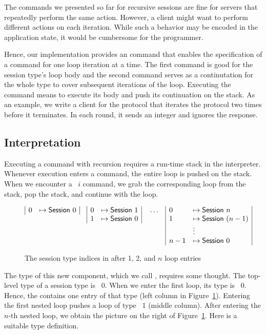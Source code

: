 \documentclass[acmsmall,review,anonymous,screen]{acmart}
\begin{document}
The commands we presented so far for recursive sessions are fine for
servers that repeatedly perform the same action. However, a client
might want to perform different actions on each iteration. While such
a behavior may be encoded in the application state, it would be cumbersome for the programmer.

Hence, our implementation provides an {\AUNROLL} command that
enables the specification of a command for one loop iteration at a time.
\rstCommandUNROLL
The first command is good for the session type's loop body and the
second command serves as a continutation for the whole type to cover subsequent
iterations of the loop. 
Executing the {\AUNROLL} command means to execute its body and push its
continuation on the stack.
\rstExecutorUNROLL
As an example, we write a client for the {\Amanyunaryp} protocol that
iterates the protocol two times before it terminates. In each round,
it sends an integer and ignores the response.
\rstClientExample

\subsection{Interpretation}
\label{sec:interpretaion}


Executing a command with recursion requires a run-time stack in the
interpreter. Whenever execution enters a {\AMU} command, the entire
loop is pushed on the stack. When we encounter a {\ACONTINUE~$i$}
command, we grab the corresponding loop from the stack, pop the stack, and
continue with the loop.

\begin{figure}[tp]
  \begin{align*}
    &
      \begin{array}[t]{|ll|}
        0 &\mapsto \ASession~0
      \end{array}
    &&
      \begin{array}[t]{|ll|}
        0 &\mapsto \ASession~1 \\
        1 &\mapsto \ASession~0
      \end{array}
          &&
             \dots
    &&
       \begin{array}[t]{|ll|}
         0 & \mapsto \ASession~n \\
         1 & \mapsto \ASession~(n-1) \\
           & \vdots \\
         n-1 & \mapsto \ASession~0
       \end{array}
  \end{align*}
  \caption{The session type indices in {\ACommandStack} after 1, 2, and $n$ loop entries}
  \label{fig:commandstore}
\end{figure}
The type of this new
component, which we call {\ACommandStack}, requires some thought.  The top-level type of a session type is
{\ASession~0}. When we enter the first loop, its type is {\ASession~0}. Hence, the {\ACommandStack} contains
one entry of that type (left column in Figure~\ref{fig:commandstore}).
Entering the first nested loop pushes a loop of type {\ASession~1}
(middle column). After entering the $n$-th nested loop, we obtain the
picture on the right of Figure~\ref{fig:commandstore}. Here is a
suitable type definition.
\rstCommandStack
\end{document}
